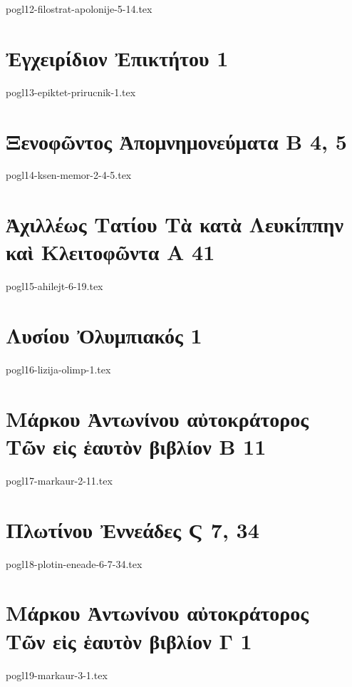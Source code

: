 \documentclass[a4paper,12pt,twoside]{report}
\begin{document}
{pogl12-filostrat-apolonije-5-14.tex}

\chapter[Ἐγχειρίδιον Ἐπικτήτου]{\textgreek[variant=ancient]{Ἐγχειρίδιον Ἐπικτήτου} 1}

{pogl13-epiktet-prirucnik-1.tex}

\chapter[Ξενοφῶντος Ἀπομνημονεύματα Β]{\textgreek[variant=ancient]{Ξενοφῶντος Ἀπομνημονεύματα Β} 4, 5}

{pogl14-ksen-memor-2-4-5.tex}

\chapter[ Ἀχιλλέως Τατίου Tὰ κατὰ Λευκίππην καὶ Κλειτοφῶντα]{\textgreek[variant=ancient]{ Ἀχιλλέως Τατίου Tὰ κατὰ Λευκίππην καὶ Κλειτοφῶντα Α} 41}

{pogl15-ahilejt-6-19.tex}

\chapter[Λυσίου Ὀλυμπιακός]{\textgreek[variant=ancient]{Λυσίου Ὀλυμπιακός} 1}

{pogl16-lizija-olimp-1.tex}

\chapter[Μάρκου Ἀντωνίνου Τῶν εἰς ἑαυτὸν Β]{\textgreek[variant=ancient]{Μάρκου Ἀντωνίνου αὐτοκράτορος \\Τῶν εἰς ἑαυτὸν βιβλίον Β} 11}

{pogl17-markaur-2-11.tex}

\chapter[Πλωτίνου Ἐννεάδες Ϛ]{\textgreek[variant=ancient]{Πλωτίνου Ἐννεάδες Ϛ} 7, 34}

{pogl18-plotin-eneade-6-7-34.tex}

\chapter[Μάρκου Ἀντωνίνου Τῶν εἰς ἑαυτὸν Γ]{\textgreek[variant=ancient]{Μάρκου Ἀντωνίνου αὐτοκράτορος \\Τῶν εἰς ἑαυτὸν βιβλίον Γ} 1}

{pogl19-markaur-3-1.tex}




\end{document}
